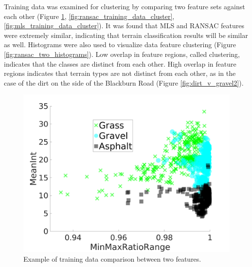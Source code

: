 \documentclass[numbered,pdftex]{ohio-etd}
\begin{document}
{{		{Training data was examined for clustering by comparing two feature sets against each other (Figure \ref{fig:range_training_data_cluster_3_in_results}, \ref{fig:ransac_training_data_cluster}, \ref{fig:mls_training_data_cluster}). It was found that MLS and RANSAC features were extremely similar, indicating that terrain classification results will be similar as well. Histograms were also used to visualize data feature clustering (Figure \ref{fig:ransac_two_histograms}). Low overlap in feature regions, called clustering, indicates that the classes are distinct from each other. High overlap in feature regions indicates that terrain types are not distinct from each other, as in the case of the dirt on the side of the Blackburn Road (Figure \ref{fig:dirt_v_gravel2}). }
		
		\begin{figure}[H]
			\centering
			\includegraphics[width=0.75\linewidth]{Defense_Images/training_data_cluster_3}
			\caption[Example Clustering]{Example of training data comparison between two features.}
			\label{fig:range_training_data_cluster_3_in_results}
		\end{figure}
				
%	
		
}}
\end{document}

